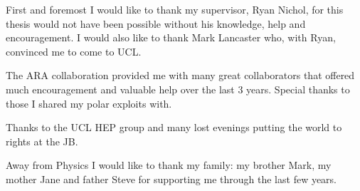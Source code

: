 First and foremost I would like to thank my supervisor, Ryan Nichol, for this thesis would not have been possible without his knowledge, help and encouragement. I would also like to thank Mark Lancaster who, with Ryan, convinced me to come to UCL.

The ARA collaboration provided me with many great collaborators that offered much encouragement and valuable help over the last 3 years. Special thanks to those I shared my polar exploits with.

Thanks to the UCL HEP group and many lost evenings putting the world to rights at the JB.

Away from Physics I would like to thank my family: my brother Mark, my mother Jane and father Steve for supporting me through the last few years. 



